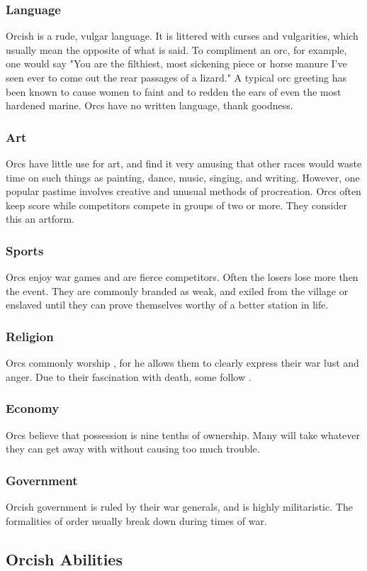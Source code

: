 \begin{multicols*}{2}
\subsubsection{Language}
Orcish is a rude, vulgar language. It is littered with curses and vulgarities, which usually mean the opposite of what is said. To compliment an orc, for example, one would say "You are the filthiest, most sickening piece or horse manure I've seen ever to come out the rear passages of a lizard." A typical orc greeting has been known to cause women to faint and to redden the ears of even the most hardened marine. Orcs have no written language, thank goodness.
\subsubsection{Art}
Orcs have little use for art, and find it very amusing that other races would waste time on such things as painting, dance, music, singing, and writing. However, one popular pastime involves creative and unusual methods of procreation. Orcs often keep score while competitors compete in groups of two or more. They consider this an artform.
\subsubsection{Sports}
Orcs enjoy war games and are fierce competitors. Often the losers lose more then the event. They are commonly branded as weak, and exiled from the village or enslaved until they can prove themselves worthy of a better station in life.
\subsubsection{Religion}
Orcs commonly worship , for he allows them to clearly express their war lust and anger. Due to their fascination with death, some follow .
\subsubsection{Economy}
Orcs believe that possession is nine tenths of ownership. Many will take whatever they can get away with without causing too much trouble.
\subsubsection{Government}
Orcish government is ruled by their war generals, and is highly militaristic. The formalities of order usually break down during times of war.
\subsection{Orcish Abilities}

\end{multicols*}
